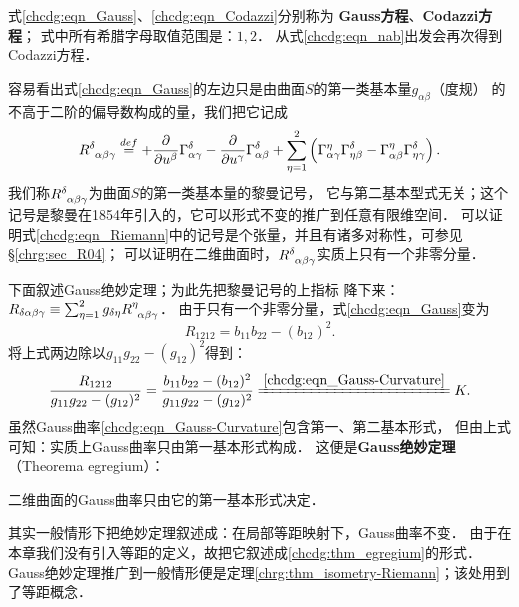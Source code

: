 式\eqref{chcdg:eqn_Gauss}、\eqref{chcdg:eqn_Codazzi}分别称为
{\bfseries\heiti Gauss方程}、{\bfseries\heiti Codazzi方程}；
式中所有希腊字母取值范围是：$1,2$．
从式\eqref{chcdg:eqn_nab}出发会再次得到Codazzi方程．


容易看出式\eqref{chcdg:eqn_Gauss}的左边只是由曲面$S$的第一类基本量$g_{\alpha \beta}$（度规）
的不高于二阶的偏导数构成的量，我们把它记成
\begin{equation}\label{chcdg:eqn_Riemann}
    R_{\hphantom{\delta} \alpha \beta \gamma}^\delta \overset{def}{=}
    +\frac{\partial}{\partial u^\beta} \Gamma_{\alpha \gamma}^\delta
    -\frac{\partial}{\partial u^\gamma} \Gamma_{\alpha \beta}^\delta
    +\sum_{\eta=1}^{2}\left( \Gamma_{\alpha \gamma}^\eta \Gamma_{\eta \beta}^\delta
    -\Gamma_{\alpha \beta}^\eta \Gamma_{\eta \gamma}^\delta \right) .
\end{equation}
我们称$R_{\hphantom{\delta} \alpha \beta \gamma}^\delta$为曲面$S$的第一类基本量的{\heiti 黎曼记号}，
它与第二基本型式无关；这个记号是黎曼在1854年引入的，它可以形式不变的推广到任意有限维空间．
可以证明式\eqref{chcdg:eqn_Riemann}中的记号是个张量，并且有诸多对称性，可参见\S\ref{chrg:sec_R04}；
可以证明在二维曲面时，$R_{\hphantom{\delta} \alpha \beta \gamma}^\delta$实质上只有一个非零分量．

下面叙述Gauss绝妙定理；为此先把黎曼记号的上指标
降下来：$R_{\delta \alpha \beta \gamma}\equiv \sum_{\eta=1}^{2} 
g_{\delta \eta}R_{\hphantom{\delta} \alpha \beta \gamma}^\eta$．
由于只有一个非零分量，式\eqref{chcdg:eqn_Gauss}变为
\begin{equation}
    R_{1212}= b_{11} b_{22} - (b_{12})^2 .
\end{equation}
将上式两边除以$g_{11} g_{22} -(g_{12})^2$得到：
\begin{equation}\label{chcdg:eqn_RK2}
    \frac{R_{1212}}{g_{11} g_{22} -(g_{12})^2}= \frac{b_{11} b_{22} -(b_{12})^2}{g_{11} g_{22} -(g_{12})^2}
    \xlongequal{\ref{chcdg:eqn_Gauss-Curvature}} K  .
\end{equation}
虽然Gauss曲率\eqref{chcdg:eqn_Gauss-Curvature}包含第一、第二基本形式，
但由上式可知：实质上Gauss曲率只由第一基本形式构成．
这便是{\heiti \bfseries Gauss绝妙定理}（Theorema egregium）：

\begin{theorem}\label{chcdg:thm_egregium}
    二维曲面的Gauss曲率只由它的第一基本形式决定．
\end{theorem}


其实一般情形下把绝妙定理叙述成：在局部等距映射下，Gauss曲率不变．
由于在本章我们没有引入等距的定义，故把它叙述成\ref{chcdg:thm_egregium}的形式．
Gauss绝妙定理推广到一般情形便是定理\ref{chrg:thm_isometry-Riemann}；该处用到了等距概念．


